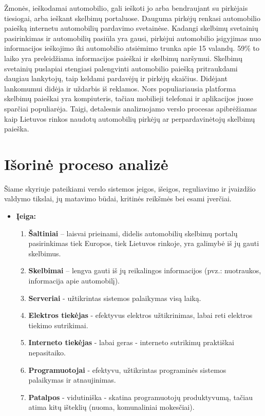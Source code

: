 \documentclass[12pt]{article}
\begin{document}
	Žmonės, ieškodamai automobilio, gali ieškoti jo arba bendraujant su pirkėjais tiesiogai, arba ieškant skelbimų portaluose. Dauguma pirkėjų renkasi automobilio paiešką internetu automobilių pardavimo svetainėse. Kadangi skelbimų svetainių pasirinkimas ir automobilių pasiūla yra gausi, pirkėjui automobilio įsigyjimas nuo informacijos ieškojimo iki automobilio atsiėmimo trunka apie 15 valandų. 59\% to laiko yra preleidžiama informacijos paieškai ir skelbimų naršymui. Skelbimų svetainių puslapiai stengiasi palengvinti automobilio paiešką pritraukdami daugiau lankytojų, taip keldami pardavėjų ir pirkėjų skaičius. Didėjant lankomumui didėja ir uždarbis iš reklamos. Nors populiariausia platforma skelbimų paieškai yra kompiuteris, tačiau mobilieji telefonai ir aplikacijos juose sparčiai populiarėja. Taigi, detalesnis analizuojamo verslo procesas apibrėžiamas kaip Lietuvos rinkos naudotų automobilių pirkėjų ar perpardavinėtojų skelbimų paieška.
	\pagebreak
	
	\section{Išorinė proceso analizė}
	Šiame skyriuje pateikiami verslo sistemos įeigos, išeigos, reguliavimo ir įvaizdžio valdymo tikslai, jų matavimo būdai, kritinės reikšmės bei esami įverčiai.
	
	\begin{itemize}
	\item{\textbf{Įeiga:}}
	\begin{enumerate}
		\item{\textbf{Šaltiniai} – laisvai prieinami, didelis automobilių skelbimų portalų pasirinkimas tiek Europos, tiek Lietuvos rinkoje, yra galimybė iš jų gauti skelbimus.}
		\item{\textbf{Skelbimai} – lengva gauti iš jų reikalingos informacijos (pvz.: nuotraukos, informacija apie automobilį).}
		\item{\textbf{Serveriai} - užtikrintas sistemos palaikymas visą laiką.}
		\item{\textbf{Elektros tiekėjas} - efektyvus elektros užtikrinimas, labai reti elektros tiekimo sutrikimai.}
		\item{\textbf{Interneto tiekėjas} - labai geras - interneto sutrikimų praktiškai nepasitaiko.}
		\item{\textbf{Programuotojai} - efektyvu, užtikrintas programinės sistemos palaikymas ir atnaujinimas.}
		\item{\textbf{Patalpos} - vidutiniška - skatina programuotojų produktyvumą, tačiau atima kitų išteklių (nuoma, komunaliniai mokesčiai).}
	\end{enumerate}
	\end{itemize}
	
\end{document}
